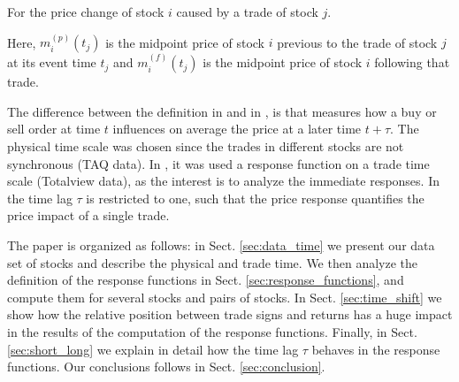 For the price change of stock $i$ caused by a trade of stock $j$.

Here, $m_{i}^{\left(p\right)}\left(t_{j}\right)$ is the midpoint price of stock
$i$ previous to the trade of stock $j$ at its event time $t_j$ and
$m_{i}^{\left(f\right)}\left(t_{j}\right)$ is the midpoint price of stock $i$
following that trade.

The difference between the definition in \cite{Wang_2016_cross} and in
\cite{Wang_2018_b}, is that \cite{Wang_2016_cross} measures how a buy or sell
order at time $t$ influences on average the price at a later time $t + \tau$.
The physical time scale was chosen since the trades in different stocks are not
synchronous (TAQ data). In \cite{Wang_2018_b}, it was used a response function
on a trade time scale (Totalview data), as the interest is to analyze the
immediate responses. In \cite{Wang_2018_b} the time lag $\tau$ is restricted to
one, such that the price response quantifies the price impact of a single
trade.

The paper is organized as follows: in Sect. \ref{sec:data_time} we present our
data set of stocks and describe the physical and trade time. We then
analyze the definition of the response functions in Sect.
\ref{sec:response_functions}, and compute them for several stocks and pairs of
stocks. In Sect. \ref{sec:time_shift} we show how the relative position between
trade signs and returns has a huge impact in the results of the computation of
the response functions. Finally, in Sect. \ref{sec:short_long} we explain in
detail how the time lag $\tau$ behaves in the response functions. Our
conclusions follows in Sect. \ref{sec:conclusion}.